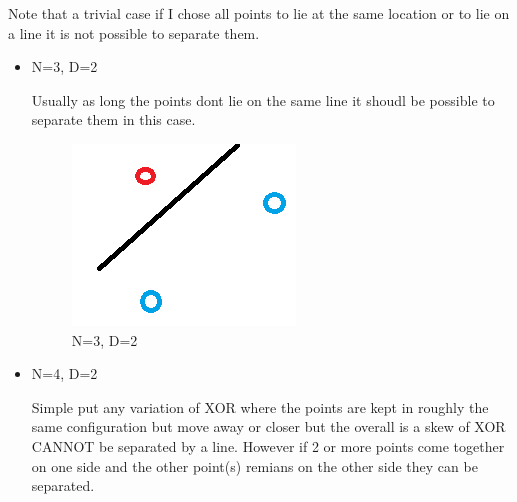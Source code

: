 \documentclass[fontsize=10pt,DIV=14]{scrartcl}
\begin{document}
	Note that a trivial case if I chose all points to lie at the same location or to lie on a line it is not possible to separate them.
	\begin{itemize}
		\item
		N=3, D=2

		Usually as long the points dont lie on the same line it shoudl be possible to separate them in this case.

		\begin{figure}[H]
			\begin{center}
				\includegraphics[scale=1.0]{resources/q4_img1.png}
				\caption{N=3, D=2}
			\end{center}
		\end{figure}

		\item
		N=4, D=2

		Simple put any variation of XOR where the points are kept in roughly the same configuration but move away or closer but the overall is a skew of XOR CANNOT be separated by a line. However if 2 or more points come together on one side and the other point(s) remians on the other side they can be separated.


\end{itemize}
\end{document}

